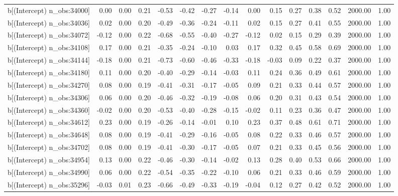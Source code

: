 \begin{table}[ht]
\begin{tabular}{rrrrrrrrrrrrrrr}
  b[(Intercept) n\_obs:34000] & 0.00 & 0.00 & 0.21 & -0.53 & -0.42 & -0.27 & -0.14 & 0.00 & 0.15 & 0.27 & 0.38 & 0.52 & 2000.00 & 1.00 \\ 
  b[(Intercept) n\_obs:34036] & 0.02 & 0.00 & 0.20 & -0.49 & -0.36 & -0.24 & -0.11 & 0.02 & 0.15 & 0.27 & 0.41 & 0.55 & 2000.00 & 1.00 \\ 
  b[(Intercept) n\_obs:34072] & -0.12 & 0.00 & 0.22 & -0.68 & -0.55 & -0.40 & -0.27 & -0.12 & 0.02 & 0.15 & 0.29 & 0.39 & 2000.00 & 1.00 \\ 
  b[(Intercept) n\_obs:34108] & 0.17 & 0.00 & 0.21 & -0.35 & -0.24 & -0.10 & 0.03 & 0.17 & 0.32 & 0.45 & 0.58 & 0.69 & 2000.00 & 1.00 \\ 
  b[(Intercept) n\_obs:34144] & -0.18 & 0.00 & 0.21 & -0.73 & -0.60 & -0.46 & -0.33 & -0.18 & -0.03 & 0.09 & 0.22 & 0.37 & 2000.00 & 1.00 \\ 
  b[(Intercept) n\_obs:34180] & 0.11 & 0.00 & 0.20 & -0.40 & -0.29 & -0.14 & -0.03 & 0.11 & 0.24 & 0.36 & 0.49 & 0.61 & 2000.00 & 1.00 \\ 
  b[(Intercept) n\_obs:34270] & 0.08 & 0.00 & 0.19 & -0.41 & -0.31 & -0.17 & -0.05 & 0.09 & 0.21 & 0.33 & 0.44 & 0.57 & 2000.00 & 1.00 \\ 
  b[(Intercept) n\_obs:34306] & 0.06 & 0.00 & 0.20 & -0.46 & -0.32 & -0.19 & -0.08 & 0.06 & 0.20 & 0.31 & 0.43 & 0.54 & 2000.00 & 1.00 \\ 
  b[(Intercept) n\_obs:34360] & -0.02 & 0.00 & 0.20 & -0.53 & -0.40 & -0.28 & -0.15 & -0.02 & 0.11 & 0.23 & 0.36 & 0.47 & 2000.00 & 1.00 \\ 
  b[(Intercept) n\_obs:34612] & 0.23 & 0.00 & 0.19 & -0.26 & -0.14 & -0.01 & 0.10 & 0.23 & 0.37 & 0.48 & 0.61 & 0.71 & 2000.00 & 1.00 \\ 
  b[(Intercept) n\_obs:34648] & 0.08 & 0.00 & 0.19 & -0.41 & -0.29 & -0.16 & -0.05 & 0.08 & 0.22 & 0.33 & 0.46 & 0.57 & 2000.00 & 1.00 \\ 
  b[(Intercept) n\_obs:34702] & 0.08 & 0.00 & 0.19 & -0.41 & -0.30 & -0.17 & -0.05 & 0.07 & 0.21 & 0.33 & 0.45 & 0.56 & 2000.00 & 1.00 \\ 
  b[(Intercept) n\_obs:34954] & 0.13 & 0.00 & 0.22 & -0.46 & -0.30 & -0.14 & -0.02 & 0.13 & 0.28 & 0.40 & 0.53 & 0.66 & 2000.00 & 1.00 \\ 
  b[(Intercept) n\_obs:34990] & 0.06 & 0.00 & 0.22 & -0.54 & -0.35 & -0.22 & -0.10 & 0.06 & 0.21 & 0.33 & 0.46 & 0.59 & 2000.00 & 1.00 \\ 
  b[(Intercept) n\_obs:35296] & -0.03 & 0.01 & 0.23 & -0.66 & -0.49 & -0.33 & -0.19 & -0.04 & 0.12 & 0.27 & 0.42 & 0.52 & 2000.00 & 1.00 \\ 

\end{tabular}
\end{table}
